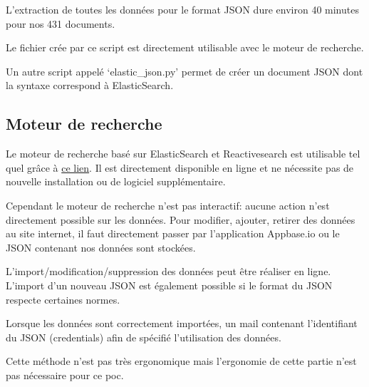 L'extraction de toutes les données pour le format JSON dure environ 40 minutes pour nos 431 documents.

Le fichier crée par ce script est directement utilisable avec le moteur de recherche.

Un autre script appelé `elastic\_json.py' permet de créer un document JSON dont la syntaxe correspond à ElasticSearch.

\subsection{Moteur de recherche}
Le moteur de recherche basé sur ElasticSearch et Reactivesearch est utilisable tel quel grâce à \href{https://ujcqr.csb.app}{ce lien}.
Il est directement disponible en ligne et ne nécessite pas de nouvelle installation ou de logiciel supplémentaire.

Cependant le moteur de recherche n'est pas interactif: aucune action n'est directement possible sur les données.
Pour modifier, ajouter, retirer des données au site internet, il faut directement passer par l'application Appbase.io ou le JSON contenant nos données sont stockées.

L'import/modification/suppression des données peut être réaliser en ligne.
L'import d'un nouveau JSON est également possible si le format du JSON respecte certaines normes. 

Lorsque les données sont correctement importées, un mail contenant l'identifiant du JSON (credentials) afin de spécifié l'utilisation des données. 

Cette méthode n'est pas très ergonomique mais l'ergonomie de cette partie n'est pas nécessaire pour ce \gls{poc}\@.
